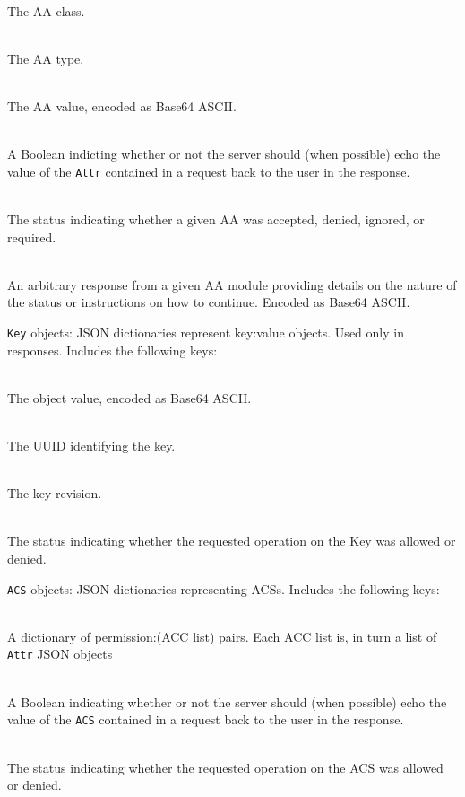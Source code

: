 \begin{packed_desc}
\item[\texttt{Class}] \hfill \\ The AA class.
\item[\texttt{Type}] \hfill \\ The AA type.
\item[\texttt{Value}] \hfill \\ The AA value, encoded as Base64 ASCII.
\item[\texttt{Echo}] \hfill \\ A Boolean indicting whether or not the
  server should (when possible) echo the value of the \texttt{Attr}
  contained in a request back to the user in the response.
\item[\texttt{Status} (Response Only)] \hfill \\ The status indicating
  whether a given AA was accepted, denied, ignored, or required.
\item[\texttt{ResValue} (Response Only)] \hfill \\ An arbitrary
  response from a given AA module providing details on the nature of
  the status or instructions on how to continue. Encoded as Base64
  ASCII.
\end{packed_desc}

\noindent
\texttt{Key} objects: JSON dictionaries represent key:value
objects. Used only in responses. Includes the following keys:

\begin{packed_desc}
\item[\texttt{Value}] \hfill \\ The object value, encoded as
  Base64 ASCII.
\item[\texttt{UUID}] \hfill \\ The UUID identifying
  the key.
\item[\texttt{Revision}] \hfill \\ The key revision.
\item[\texttt{Status}] \hfill \\ The status indicating
  whether the requested operation on the Key was allowed or denied.
\end{packed_desc}

\noindent
\texttt{ACS} objects: JSON dictionaries representing ACSs. Includes
the following keys:

\begin{packed_desc}
\item[\texttt{Permissions}] \hfill \\ A dictionary of permission:(ACC
  list) pairs. Each ACC list is, in turn a list of \texttt{Attr} JSON
  objects
\item[\texttt{Echo}] \hfill \\ A Boolean indicating whether or not the
  server should (when possible) echo the value of the \texttt{ACS}
  contained in a request back to the user in the response.
\item[\texttt{Status} (Response Only)] \hfill \\ The status indicating
  whether the requested operation on the ACS was allowed or denied.
\end{packed_desc}

